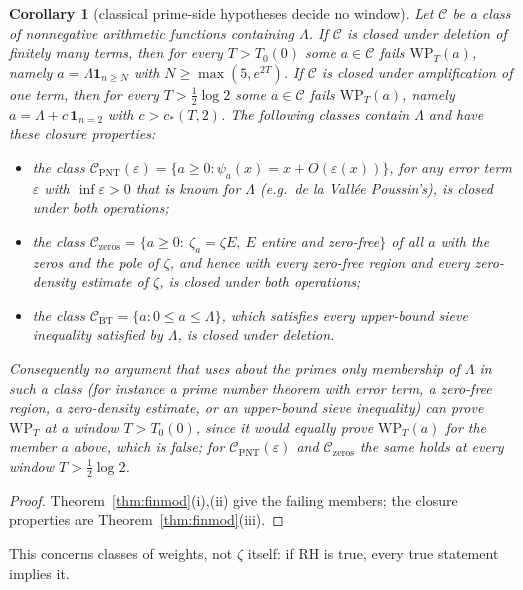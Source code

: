 \documentclass[11pt]{amsart}
\newtheorem{corollary}[theorem]{Corollary}
\theoremstyle{definition}
\theoremstyle{remark}
\begin{document}
\begin{corollary}[classical prime-side hypotheses decide no window]\label{cor:void}
Let $\mathcal C$ be a class of nonnegative arithmetic functions containing $\Lambda$. If $\mathcal C$ is
closed under deletion of finitely many terms, then for every $T>T_0(0)$ some $a\in\mathcal C$ fails
$\mathrm{WP}_T(a)$, namely $a=\Lambda\mathbf 1_{n\ge N}$ with $N\ge\max(5,e^{2T})$. If $\mathcal C$ is closed under
amplification of one term, then for every $T>\frac12\log2$ some $a\in\mathcal C$ fails $\mathrm{WP}_T(a)$, namely
$a=\Lambda+c\,\mathbf 1_{n=2}$ with $c>c_*(T,2)$. The following classes contain $\Lambda$ and have these closure
properties:
\begin{itemize}
\item the class $\mathcal C_{\mathrm{PNT}}(\varepsilon)=\{a\ge0:\psi_a(x)=x+O(\varepsilon(x))\}$, for any error term
$\varepsilon$ with $\inf\varepsilon>0$ that is known for $\Lambda$ (e.g.\ de la Vall\'ee Poussin's), is closed under
both operations;
\item the class $\mathcal C_{\mathrm{zeros}}=\{a\ge0:\ \zeta_a=\zeta E,\ E$ entire and zero-free$\}$ of all $a$ with
the zeros and the pole of $\zeta$, and hence with every zero-free region and every zero-density estimate
of $\zeta$, is closed under both operations;
\item the class $\mathcal C_{\mathrm{BT}}=\{a:0\le a\le\Lambda\}$, which satisfies every upper-bound sieve
inequality satisfied by $\Lambda$, is closed under deletion.
\end{itemize}
Consequently no argument that uses about the primes only membership of $\Lambda$ in such a class (for
instance a prime number theorem with error term, a zero-free region, a zero-density estimate, or an
upper-bound sieve inequality) can prove $\mathrm{WP}_T$ at a window $T>T_0(0)$, since it would equally prove
$\mathrm{WP}_T(a)$ for the member $a$ above, which is false; for $\mathcal C_{\mathrm{PNT}}(\varepsilon)$ and
$\mathcal C_{\mathrm{zeros}}$ the same holds at every window $T>\frac12\log2$.
\end{corollary}
\begin{proof}
Theorem~\ref{thm:finmod}(i),(ii) give the failing members; the closure properties are
Theorem~\ref{thm:finmod}(iii).
\end{proof}

This concerns classes of weights, not $\zeta$ itself: if RH is true, every true statement implies it.
\end{document}

